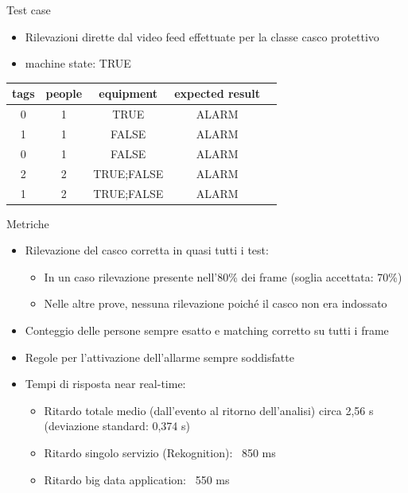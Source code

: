 \documentclass{beamer}
\begin{document}
\begin{frame}{Test case}

\begin{itemize}
    \item Rilevazioni dirette dal video feed effettuate per la classe casco protettivo
    \item machine state: TRUE
\end{itemize}
\vspace{0.5cm}

\begin{table}[h]
\centering
\begin{tabular}{c c c c c}
\hline
\textbf{tags} & \textbf{people} & \textbf{equipment} & \textbf{expected result} \\
\hline
0 & 1 & TRUE & ALARM \\
1 & 1 & FALSE & ALARM \\
0 & 1 & FALSE  & ALARM \\
2 & 2 & TRUE;FALSE & ALARM \\
1 & 2 & TRUE;FALSE & ALARM \\
\hline
\end{tabular}
\end{table}

\end{frame}


\begin{frame}{Metriche}
\begin{itemize}
    \item Rilevazione del casco corretta in quasi tutti i test:
        \begin{itemize}
            \item In un caso rilevazione presente nell’80\% dei frame (soglia accettata: 70\%)
            \item Nelle altre prove, nessuna rilevazione poiché il casco non era indossato
        \end{itemize}
    \item Conteggio delle persone sempre esatto e matching corretto su tutti i frame
    \item Regole per l’attivazione dell’allarme sempre soddisfatte
    \item Tempi di risposta near real-time:
        \begin{itemize}
            \item Ritardo totale medio (dall’evento al ritorno dell’analisi) circa 2,56 s (deviazione standard: 0,374 s)
            \item Ritardo singolo servizio (Rekognition): ~850 ms
            \item Ritardo big data application: ~550 ms
        \end{itemize}
\end{itemize}
\end{frame}
\end{document}
